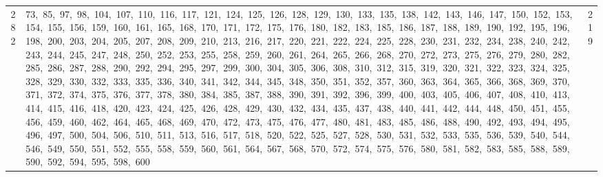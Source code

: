 \begin{longtable}{c|p{}|r}
282 & 73,\ 85,\ 97,\ 98,\ 104,\ 107,\ 110,\ 116,\ 117,\ 121,\ 124,\ 125,\ 126,\ 128,\ 129,\ 130,\ 133,\ 135,\ 138,\ 142,\ 143,\ 146,\ 147,\ 150,\ 152,\ 153,\ 154,\ 155,\ 156,\ 159,\ 160,\ 161,\ 165,\ 168,\ 170,\ 171,\ 172,\ 175,\ 176,\ 180,\ 182,\ 183,\ 185,\ 186,\ 187,\ 188,\ 189,\ 190,\ 192,\ 195,\ 196,\ 198,\ 200,\ 203,\ 204,\ 205,\ 207,\ 208,\ 209,\ 210,\ 213,\ 216,\ 217,\ 220,\ 221,\ 222,\ 224,\ 225,\ 228,\ 230,\ 231,\ 232,\ 234,\ 238,\ 240,\ 242,\ 243,\ 244,\ 245,\ 247,\ 248,\ 250,\ 252,\ 253,\ 255,\ 258,\ 259,\ 260,\ 261,\ 264,\ 265,\ 266,\ 268,\ 270,\ 272,\ 273,\ 275,\ 276,\ 279,\ 280,\ 282,\ 285,\ 286,\ 287,\ 288,\ 290,\ 292,\ 294,\ 295,\ 297,\ 299,\ 300,\ 304,\ 305,\ 306,\ 308,\ 310,\ 312,\ 315,\ 319,\ 320,\ 321,\ 322,\ 323,\ 324,\ 325,\ 328,\ 329,\ 330,\ 332,\ 333,\ 335,\ 336,\ 340,\ 341,\ 342,\ 344,\ 345,\ 348,\ 350,\ 351,\ 352,\ 357,\ 360,\ 363,\ 364,\ 365,\ 366,\ 368,\ 369,\ 370,\ 371,\ 372,\ 374,\ 375,\ 376,\ 377,\ 378,\ 380,\ 384,\ 385,\ 387,\ 388,\ 390,\ 391,\ 392,\ 396,\ 399,\ 400,\ 403,\ 405,\ 406,\ 407,\ 408,\ 410,\ 413,\ 414,\ 415,\ 416,\ 418,\ 420,\ 423,\ 424,\ 425,\ 426,\ 428,\ 429,\ 430,\ 432,\ 434,\ 435,\ 437,\ 438,\ 440,\ 441,\ 442,\ 444,\ 448,\ 450,\ 451,\ 455,\ 456,\ 459,\ 460,\ 462,\ 464,\ 465,\ 468,\ 469,\ 470,\ 472,\ 473,\ 475,\ 476,\ 477,\ 480,\ 481,\ 483,\ 485,\ 486,\ 488,\ 490,\ 492,\ 493,\ 494,\ 495,\ 496,\ 497,\ 500,\ 504,\ 506,\ 510,\ 511,\ 513,\ 516,\ 517,\ 518,\ 520,\ 522,\ 525,\ 527,\ 528,\ 530,\ 531,\ 532,\ 533,\ 535,\ 536,\ 539,\ 540,\ 544,\ 546,\ 549,\ 550,\ 551,\ 552,\ 555,\ 558,\ 559,\ 560,\ 561,\ 564,\ 567,\ 568,\ 570,\ 572,\ 574,\ 575,\ 576,\ 580,\ 581,\ 582,\ 583,\ 585,\ 588,\ 589,\ 590,\ 592,\ 594,\ 595,\ 598,\ 600 & 219 \\

\end{longtable}
